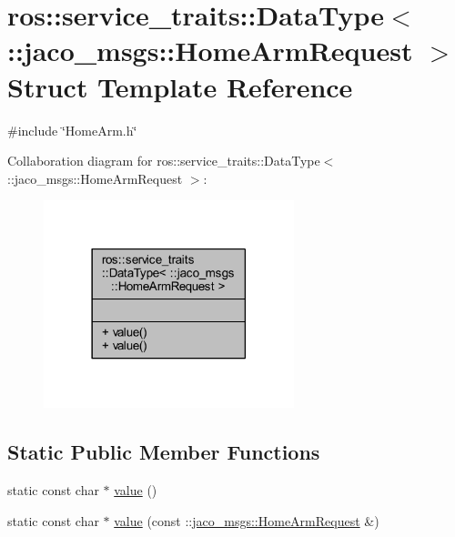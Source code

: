\hypertarget{structros_1_1service__traits_1_1DataType_3_01_1_1jaco__msgs_1_1HomeArmRequest_01_4}{}\section{ros\+:\+:service\+\_\+traits\+:\+:Data\+Type$<$ \+:\+:jaco\+\_\+msgs\+:\+:Home\+Arm\+Request $>$ Struct Template Reference}
\label{structros_1_1service__traits_1_1DataType_3_01_1_1jaco__msgs_1_1HomeArmRequest_01_4}


{\ttfamily \#include \char`\"{}Home\+Arm.\+h\char`\"{}}



Collaboration diagram for ros\+:\+:service\+\_\+traits\+:\+:Data\+Type$<$ \+:\+:jaco\+\_\+msgs\+:\+:Home\+Arm\+Request $>$\+:
\nopagebreak
\begin{figure}[H]
\begin{center}
\leavevmode
\includegraphics[width=206pt]{d6/d18/structros_1_1service__traits_1_1DataType_3_01_1_1jaco__msgs_1_1HomeArmRequest_01_4__coll__graph}
\end{center}
\end{figure}
\subsection*{Static Public Member Functions}
\begin{DoxyCompactItemize}
\item 
static const char $\ast$ \hyperlink{structros_1_1service__traits_1_1DataType_3_01_1_1jaco__msgs_1_1HomeArmRequest_01_4_a56600149c4c818c07df96aced2047288}{value} ()
\item 
static const char $\ast$ \hyperlink{structros_1_1service__traits_1_1DataType_3_01_1_1jaco__msgs_1_1HomeArmRequest_01_4_acf9efc88ba27d328e6d7fa8df342095d}{value} (const \+::\hyperlink{namespacejaco__msgs_a8c93ee6cb88452df5f0a3c5aec628121}{jaco\+\_\+msgs\+::\+Home\+Arm\+Request} \&)
\end{DoxyCompactItemize}


